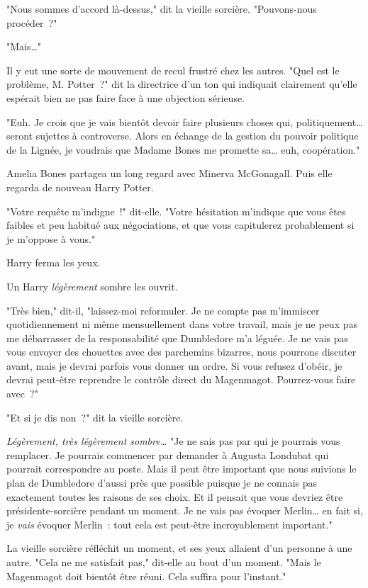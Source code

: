 "Nous sommes d'accord là-dessus," dit la vieille sorcière. "Pouvons-nous procéder~?"

"Mais…"

Il y eut une sorte de mouvement de recul frustré chez les autres. "Quel est le problème, M. Potter~?" dit la directrice d'un ton qui indiquait clairement qu'elle espérait bien ne pas faire face à une objection sérieuse.

"Euh. Je crois que je vais bientôt devoir faire plusieurs choses qui, politiquement… seront sujettes à controverse. Alors en échange de la gestion du pouvoir politique de la Lignée, je voudrais que Madame Bones me promette sa… euh, coopération."

Amelia Bones partagea un long regard avec Minerva McGonagall. Puis elle regarda de nouveau Harry Potter.

"Votre requête m'indigne~!" dit-elle. "Votre hésitation m'indique que vous êtes faibles et peu habitué aux négociations, et que vous capitulerez probablement si je m'oppose à vous."

Harry ferma les yeux.

Un Harry \emph{légèrement} sombre les ouvrit.

"Très bien," dit-il, "laissez-moi reformuler. Je ne compte pas m'immiscer quotidiennement ni même mensuellement dans votre travail, mais je ne peux pas me débarrasser de la responsabilité que Dumbledore m'a léguée. Je ne vais pas vous envoyer des chouettes avec des parchemins bizarres, nous pourrons discuter avant, mais je devrai parfois vous donner un ordre. Si vous refusez d'obéir, je devrai peut-être reprendre le contrôle direct du Magenmagot. Pourrez-vous faire avec~?"

"Et si je dis non~?" dit la vieille sorcière.

\emph{Légèrement, très légèrement sombre…} "Je ne sais pas par qui je pourrais vous remplacer. Je pourrais commencer par demander à Augusta Londubat qui pourrait correspondre au poste. Mais il peut être important que nous suivions le plan de Dumbledore d'aussi près que possible puisque je ne connais pas exactement toutes les raisons de ses choix. Et il pensait que vous devriez être présidente-sorcière pendant un moment. Je ne vais pas évoquer Merlin… en fait si, je \emph{vais} évoquer Merlin~: tout cela est peut-être incroyablement important."

La vieille sorcière réfléchit un moment, et ses yeux allaient d'un personne à une autre. "Cela ne me satisfait pas," dit-elle au bout d'un moment. "Mais le Magenmagot doit bientôt être réuni. Cela suffira pour l'instant."

